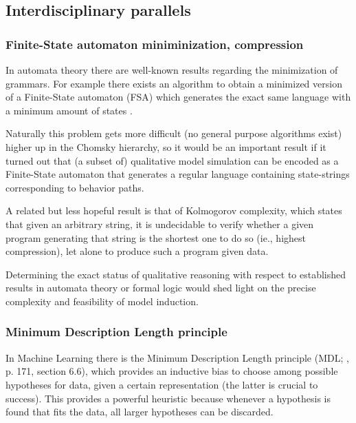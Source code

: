 \documentclass{article} %
\begin{document}
\subsection{Interdisciplinary parallels}


\subsubsection{Finite-State automaton miniminization, compression}

	In automata theory there are well-known results regarding the
	minimization of grammars. For example there exists an algorithm to
	obtain a minimized version of a Finite-State automaton (FSA) which
	generates the exact same language with a minimum amount of states
	\cite{hopcroft}.

	Naturally this problem gets more difficult (no general purpose
	algorithms exist) higher up in the Chomsky hierarchy, so it would be
	an important result if it turned out that (a subset of) qualitative
	model simulation can be encoded as a Finite-State automaton that
	generates a regular language containing state-strings corresponding to
	behavior paths.

	A related but less hopeful result is that of Kolmogorov complexity,
	which states that given an arbitrary string, it is undecidable to
	verify whether a given program generating that string is the shortest
	one to do so (ie., highest compression), let alone to produce such a
	program given data.

	Determining the exact status of qualitative reasoning with respect to
	established results in automata theory or formal logic would shed light
	on the precise complexity and feasibility of model induction.

\subsubsection{Minimum Description Length principle}

	In Machine Learning there is the Minimum Description Length principle
	(MDL; \cite{mitchell}, p. 171, section 6.6), which provides an
	inductive bias to choose among possible hypotheses for data, given a
	certain representation (the latter is crucial to success).  This
	provides a powerful heuristic because whenever a hypothesis is found
	that fits the data, all larger hypotheses can be discarded.
	
\end{document}
